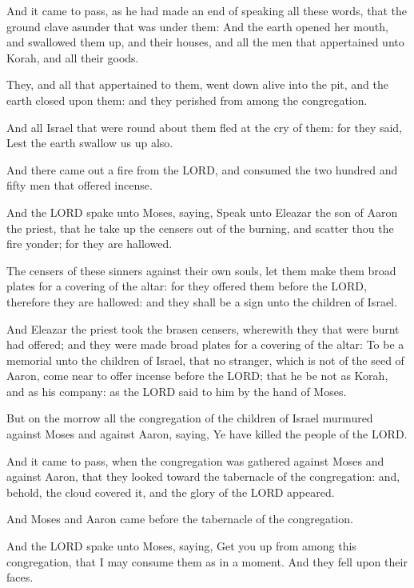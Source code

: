 \verse And it came to pass, as he had made an end of speaking all these
words, that the ground clave asunder that was under them: \verse And
the earth opened her mouth, and swallowed them up, and their houses,
and all the men that appertained unto Korah, and all their goods.

\verse They, and all that appertained to them, went down alive into the
pit, and the earth closed upon them: and they perished from among the
congregation.

\verse And all Israel that were round about them fled at the cry of
them: for they said, Lest the earth swallow us up also.

\verse And there came out a fire from the LORD, and consumed the two
hundred and fifty men that offered incense.

\verse And the LORD spake unto Moses, saying, \verse Speak unto Eleazar
the son of Aaron the priest, that he take up the censers out of the
burning, and scatter thou the fire yonder; for they are hallowed.

\verse The censers of these sinners against their own souls, let them
make them broad plates for a covering of the altar: for they offered
them before the LORD, therefore they are hallowed: and they shall be a
sign unto the children of Israel.

\verse And Eleazar the priest took the brasen censers, wherewith they
that were burnt had offered; and they were made broad plates for a
covering of the altar: \verse To be a memorial unto the children of
Israel, that no stranger, which is not of the seed of Aaron, come near
to offer incense before the LORD; that he be not as Korah, and as his
company: as the LORD said to him by the hand of Moses.

\verse But on the morrow all the congregation of the children of Israel
murmured against Moses and against Aaron, saying, Ye have killed the
people of the LORD.

\verse And it came to pass, when the congregation was gathered against
Moses and against Aaron, that they looked toward the tabernacle of the
congregation: and, behold, the cloud covered it, and the glory of the
LORD appeared.

\verse And Moses and Aaron came before the tabernacle of the
congregation.

\verse And the LORD spake unto Moses, saying, \verse Get you up from
among this congregation, that I may consume them as in a moment. And
they fell upon their faces.

